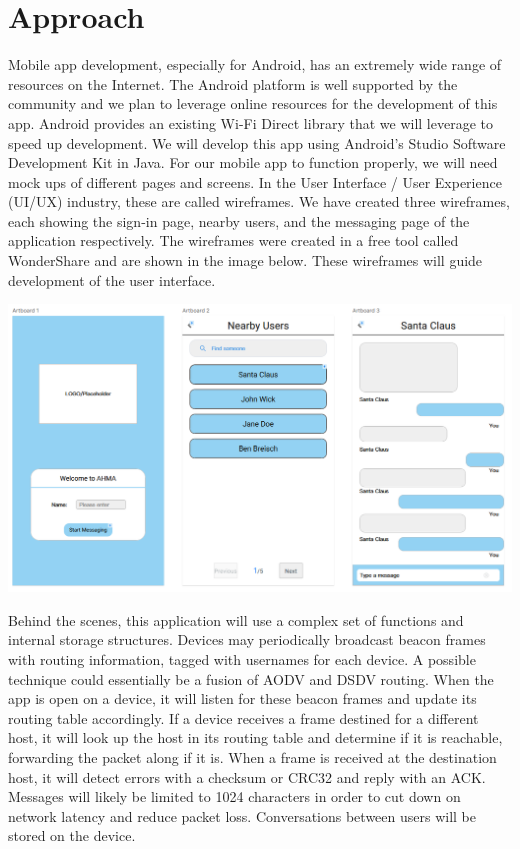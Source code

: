 \documentclass[10pt]{article}
\begin{document}
\section{Approach} %
Mobile app development, especially for Android, has an extremely wide range of resources on the Internet. The Android platform is well supported by the community and we plan to leverage online resources for the development of this app. Android provides an existing Wi-Fi Direct library that we will leverage to speed up development. We will develop this app using Android's Studio Software Development Kit in Java. For our mobile app to function properly, we will need mock ups of different pages and screens. In the User Interface / User Experience (UI/UX) industry, these are called wireframes. We have created three wireframes, each showing the sign-in page, nearby users, and the messaging page of the application respectively. The wireframes were created in a free tool called WonderShare and are shown in the image below. These wireframes will guide development of the user interface.\\
\begin{center}
    \includegraphics[scale=0.5]{wireframe.png} \\
\end{center}
Behind the scenes, this application will use a complex set of functions and internal storage structures. Devices may periodically broadcast beacon frames with routing information, tagged with usernames for each device. A possible technique could essentially be a fusion of AODV and DSDV routing. When the app is open on a device, it will listen for these beacon frames and update its routing table accordingly. If a device receives a frame destined for a different host, it will look up the host in its routing table and determine if it is reachable, forwarding the packet along if it is. When a frame is received at the destination host, it will detect errors with a checksum or CRC32 and reply with an ACK. Messages will likely be limited to 1024 characters in order to cut down on network latency and reduce packet loss. Conversations between users will be stored on the device.
\end{document}
